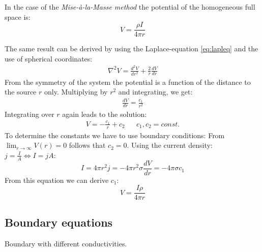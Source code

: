 In the case of the \textit{Mise-\`a-la-Masse method} the potential of the homogeneous full space is:
\begin{equation}
V=\frac{\rho I}{4\pi r}
\end{equation}

The same result can be derived by using the Laplace-equation \eqref{eq:lapleq} and the use of spherical coordinates:
\begin{align*}
\nabla^2 V=\frac{d^2V}{dr^2}+\frac{2}{r}\frac{dV}{dr}
\end{align*}
From the symmetry of the system the potential is a function of the distance to the source $r$ only. Multiplying by $r^2$ and integrating, we get:
\begin{align*}
\frac{dV}{dr}=\frac{c_1}{r^2}
\end{align*}
Integrating over $r$ again leads to the solution:
\begin{align*}
V=-\frac{c_1}{r}+c_2 && c_1,c_2 = const.
\end{align*}
To determine the constants we have to use boundary conditions: From $\lim_{r \to \infty} V(r) = 0$ follows that $c_2=0$. Using the current density: $j=\frac{I}{A}\Leftrightarrow I=jA$:
\begin{equation*}
I=4\pi r^2j=-4\pi r^2\sigma\frac{dV}{dr}=-4\pi\sigma c_1
\end{equation*}
From this equation we can derive $c_1$:
\begin{equation}
V=\frac{I\rho}{4\pi r}
\end{equation}

\subsection*{Boundary equations}
Boundary with different conductivities.

